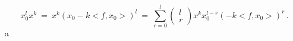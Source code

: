 \begin{equation} x_0^l x^k \ = \ x^k ( x_0 - k <f , x_0> )^l \ = \
\sum_{r=0}^{l}\left(\begin{array}{c}l\\r\end{array}\right) x^k
x_0^{l-r} (-k <f , x_0>)^r\, .\label{429}\end{equation}a
